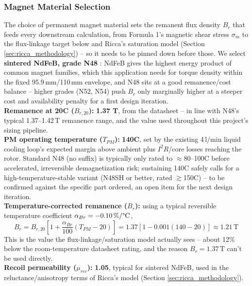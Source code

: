 \documentclass[11pt,a4paper]{article}
\begin{document}
\subsubsection*{Magnet Material Selection}
\label{sec:magnet_material}
The choice of permanent magnet material sets the remanent flux density $B_r$ that feeds every downstream calculation, from Formula 1's magnetic shear stress $\sigma_m$ to the flux-linkage target below and Ricca's saturation model (Section \ref{sec:ricca_methodology}) -- so it needs to be pinned down before those. We select \textbf{sintered NdFeB, grade N48} \cite{ACHMagnetsN48}: NdFeB gives the highest energy product of common magnet families, which this application needs for torque density within the fixed 95.9\,mm/110\,mm envelope, and N48 sits at a good remanence/cost balance -- higher grades (N52, N54) push $B_r$ only marginally higher at a steeper cost and availability penalty for a first design iteration.
\\\textbf{Remanence at 20\textdegree{}C ($B_{r,20}$):} \textbf{1.37 T}, from the datasheet \cite{ACHMagnetsN48} -- in line with N48's typical 1.37--1.42\,T remanence range, and the value used throughout this project's sizing pipeline.
\\\textbf{PM operating temperature ($T_{PM}$):} \textbf{140\textdegree{}C}, set by the existing 4\,l/min liquid cooling loop's expected margin above ambient plus $I^2R$/core losses reaching the rotor. Standard N48 (no suffix) is typically only rated to $\approx$80--100\textdegree{}C before accelerated, irreversible demagnetization risk; sustaining 140\textdegree{}C safely calls for a high-temperature-stable variant (N48SH or better, rated $\gtrsim$150\textdegree{}C) -- to be confirmed against the specific part ordered, an open item for the next design iteration.
\\\textbf{Temperature-corrected remanence ($B_r$):} using a typical reversible temperature coefficient $\alpha_{Br}=-0.10\,\%/\text{\textdegree{}C}$,
\begin{equation}
\label{eq:br_derating}
B_r = B_{r,20}\left[1+\frac{\alpha_{Br}}{100}(T_{PM}-20)\right] = 1.37\left[1-0.001(140-20)\right] \approx 1.21\,\text{T}
\end{equation}
This is the value the flux-linkage/saturation model actually sees -- about 12\% below the room-temperature datasheet rating, and the reason $B_r=1.37\,\text{T}$ can't be used directly.
\\\textbf{Recoil permeability ($\mu_{rec}$):} \textbf{1.05}, typical for sintered NdFeB, used in the reluctance/anisotropy terms of Ricca's model (Section \ref{sec:ricca_methodology}).
\end{document}
